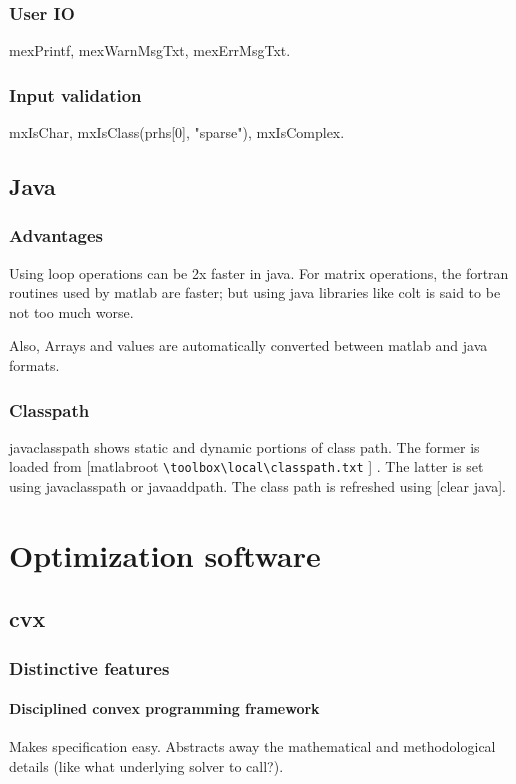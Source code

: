 \documentclass[oneside, article]{memoir}
\begin{document}
\subsection{User IO}
mexPrintf, mexWarnMsgTxt, mexErrMsgTxt.

\subsection{Input validation}
mxIsChar, mxIsClass(prhs[0], "sparse"), mxIsComplex.

\section{Java}
\subsection{Advantages}
Using loop operations can be 2x faster in java. For matrix operations, the fortran routines used by matlab are faster; but using java libraries like colt is said to be not too much worse.

Also, Arrays and values are automatically converted between matlab and java formats.


\subsection{Classpath}
javaclasspath shows static and dynamic portions of class path. The former is loaded from [matlabroot \verb '\toolbox\local\classpath.txt' ]
. The latter is set using javaclasspath or javaaddpath. The class path is refreshed using [clear java].

\chapter{Optimization software}
\section{cvx}
\subsection{Distinctive features}
\subsubsection{Disciplined convex programming framework}
Makes specification easy. Abstracts away the mathematical and methodological details (like what underlying solver to call?).
\end{document}
